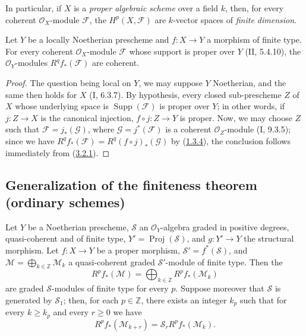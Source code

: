In particular, if $X$ is a \emph{proper algebraic scheme} over a field
$k$, then, for every coherent $\mathcal O_X$-module $\mathcal F$, the
$H^p(X,\mathcal F)$ are $k$-vector spaces of \emph{finite
dimension}.

\begin{corollary}[3.2.4]
\label{III.3.2.4}
Let $Y$ be a locally Noetherian prescheme and $f:X\to Y$ a morphism of
finite type. For every coherent $\mathcal O_X$-module $\mathcal F$ whose
support is proper over $Y$ (II, 5.4.10), the $\mathcal O_Y$-modules
$R^qf_*(\mathcal F)$ are coherent.
\end{corollary}

\begin{proof}
The question being local on $Y$, we may suppose $Y$ Noetherian, and the
same then holds for $X$ (I, 6.3.7). By hypothesis, every closed sub-prescheme
$Z$ of $X$ whose underlying space is $\operatorname{Supp}(\mathcal F)$
is proper over $Y$; in other words, if $j:Z\to X$ is the canonical injection,
$f\circ j:Z\to Y$ is proper. Now, we may choose $Z$ such that
$\mathcal F=j_*(\mathcal G)$, where $\mathcal G=j^*(\mathcal F)$ is a
coherent $\mathcal O_Z$-module (I, 9.3.5); since we have
$R^qf_*(\mathcal F)=R^q(f\circ j)_*(\mathcal G)$ by
(\hyperref[III.1.3.4]{1.3.4}), the conclusion follows immediately from
(\hyperref[III.3.2.1]{3.2.1}).
\end{proof}

\subsection{Generalization of the finiteness theorem (ordinary schemes)}
\label{subsection:III.3.3}

\begin{proposition}[3.3.1]
\label{III.3.3.1}
Let $Y$ be a Noetherian prescheme, $\mathcal S$ an
$\mathcal O_Y$-algebra graded in positive degrees, quasi-coherent and of finite
type, $Y'=\operatorname{Proj}(\mathcal S)$, and $g:Y'\to Y$ the structural
morphism. Let $f:X\to Y$ be a proper morphism,
$\mathcal S'=f^*(\mathcal S)$, and
$\mathcal M=\bigoplus_{k\in\mathbb Z}\mathcal M_k$ a quasi-coherent graded
$\mathcal S'$-module of finite type. Then the
\[
R^pf_*(\mathcal M)=\bigoplus_{k\in\mathbb Z}R^pf_*(\mathcal M_k)
\]
are graded $\mathcal S$-modules of finite type for every $p$. Suppose
moreover that $\mathcal S$ is generated by $\mathcal S_1$; then, for
each $p\in\mathbb Z$, there exists an integer $k_p$ such that for every
$k\geq k_p$ and every $r\geq0$ we have
\[
R^pf_*(\mathcal M_{k+r})=\mathcal S_rR^pf_*(\mathcal M_k).
\tag{3.3.1.1}\label{III.3.3.1.1}
\]
\end{proposition}

